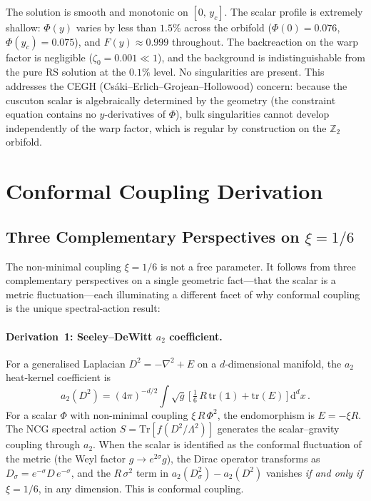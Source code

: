\noindent
The solution is smooth and monotonic on $[0,\,y_c]$. The scalar profile is extremely shallow: $\Phi(y)$ varies by less than $1.5\%$ across the orbifold ($\Phi(0) = 0.076$, $\Phi(y_c) = 0.075$), and $F(y) \approx 0.999$ throughout. The backreaction on the warp factor is negligible ($\zeta_0 = 0.001 \ll 1$), and the background is indistinguishable from the pure RS solution at the $0.1\%$ level. No singularities are present. This addresses the CEGH (Cs\'aki--Erlich--Grojean--Hollowood) concern: because the cuscuton scalar is algebraically determined by the geometry (the constraint equation contains no $y$-derivatives of $\Phi$), bulk singularities cannot develop independently of the warp factor, which is regular by construction on the $\mathbb{Z}_2$ orbifold.


\section{Conformal Coupling Derivation}
\label{app:xi}

\subsection{Three Complementary Perspectives on $\xi = 1/6$}

The non-minimal coupling $\xi = 1/6$ is not a free parameter. It follows from three complementary perspectives on a single geometric fact---that the scalar is a metric fluctuation---each illuminating a different facet of why conformal coupling is the unique spectral-action result:

\paragraph{Derivation~1: Seeley--DeWitt $a_2$ coefficient.}
For a generalised Laplacian $D^2 = -\nabla^2 + E$ on a $d$-dimensional manifold, the $a_2$ heat-kernel coefficient is
\begin{equation}
  a_2(D^2) = (4\pi)^{-d/2} \int \!\sqrt{g}\,\bigl[\,\tfrac{1}{6}\,R\,\mathrm{tr}(\mathbb{1}) + \mathrm{tr}(E)\,\bigr]\,\mathrm{d}^d x\,.
\end{equation}
For a scalar $\Phi$ with non-minimal coupling $\xi\,R\,\Phi^2$, the endomorphism is $E = -\xi R$. The NCG spectral action $S = \mathrm{Tr}[f(D^2/\Lambda^2)]$ generates the scalar--gravity coupling through $a_2$. When the scalar is identified as the conformal fluctuation of the metric (the Weyl factor $g \to e^{2\sigma}g$), the Dirac operator transforms as $D_\sigma = e^{-\sigma} D\, e^{-\sigma}$, and the $R\,\sigma^2$ term in $a_2(D_\sigma^2) - a_2(D^2)$ vanishes \emph{if and only if} $\xi = 1/6$, in any dimension. This is conformal coupling.

